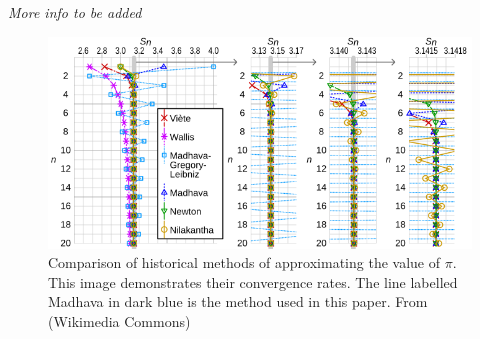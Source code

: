 \textit{More info to be added}


\begin{figure}[h]
    \includegraphics[width=\linewidth]{image.png}
    \caption{Comparison of historical methods of approximating the value of $\pi$. This image demonstrates
    their convergence rates. The line labelled Madhava in dark blue is the method used in this paper. 
    From (Wikimedia Commons) \cite{infinite_series_comparaison}}
    \label{fig:comparaison}
  \end{figure}
